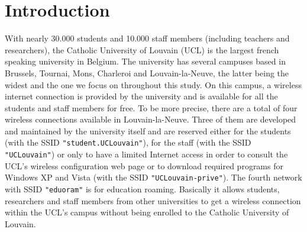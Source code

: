 
\chapter{Introduction} %

\label{Chapter1} %



With nearly 30.000 students and 10.000 staff members (including teachers and researchers), the Catholic University of Louvain (UCL) is the largest french speaking university in Belgium. The university has several campuses based in Brussels, Tournai, Mons, Charleroi and Louvain-la-Neuve, the latter being the widest and the one we focus on throughout this study. On this campus, a wireless internet connection is provided by the university and is available for all the students and staff members for free. To be more precise, there are a total of four wireless connections available in Louvain-la-Neuve. Three of them are developed and maintained by the university itself and are reserved either for the students (with the SSID \texttt{"student.UCLouvain"}), for the staff (with the SSID \texttt{"UCLouvain"}) or only to have a limited Internet access in order to consult the UCL's wireless configuration web page or to download required programs  for Windows XP and Vista (with the SSID \texttt{"UCLouvain-prive"}). The fourth network with SSID \texttt{"eduoram"} is for education roaming. Basically it allows students, researchers and staff members from other universities to get a wireless connection within the UCL's campus without being enrolled to the Catholic University of Louvain.

